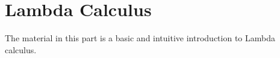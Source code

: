\documentclass[../../include/open-logic-part]{subfiles}
\begin{document}
\part{Lambda Calculus}

\begin{editorial}
  The material in this part is a basic and intuitive introduction to
  Lambda calculus.
\end{editorial}

\OLEndPartHook
\end{document}
